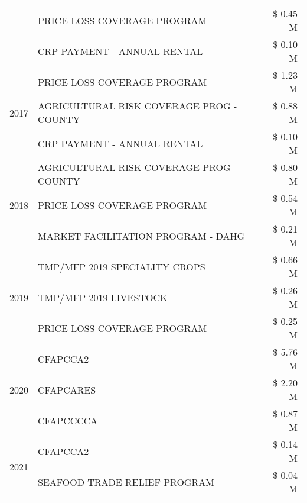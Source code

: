 \begin{tabular}{llr}
 & PRICE LOSS COVERAGE PROGRAM & \$ 0.45 M \\
 & CRP PAYMENT - ANNUAL RENTAL & \$ 0.10 M \\
\cline{1-3}
\multirow[t]{3}{*}{2017} & PRICE LOSS COVERAGE PROGRAM & \$ 1.23 M \\
 & AGRICULTURAL RISK COVERAGE PROG - COUNTY & \$ 0.88 M \\
 & CRP PAYMENT - ANNUAL RENTAL & \$ 0.10 M \\
\cline{1-3}
\multirow[t]{3}{*}{2018} & AGRICULTURAL RISK COVERAGE PROG - COUNTY & \$ 0.80 M \\
 & PRICE LOSS COVERAGE PROGRAM & \$ 0.54 M \\
 & MARKET FACILITATION PROGRAM - DAHG & \$ 0.21 M \\
\cline{1-3}
\multirow[t]{3}{*}{2019} & TMP/MFP 2019 SPECIALITY CROPS & \$ 0.66 M \\
 & TMP/MFP 2019 LIVESTOCK & \$ 0.26 M \\
 & PRICE LOSS COVERAGE PROGRAM & \$ 0.25 M \\
\cline{1-3}
\multirow[t]{3}{*}{2020} & CFAPCCA2 & \$ 5.76 M \\
 & CFAPCARES & \$ 2.20 M \\
 & CFAPCCCCA & \$ 0.87 M \\
\cline{1-3}
\multirow[t]{2}{*}{2021} & CFAPCCA2 & \$ 0.14 M \\
 & SEAFOOD TRADE RELIEF PROGRAM & \$ 0.04 M \\
\cline{1-3}
\bottomrule
\end{tabular}
